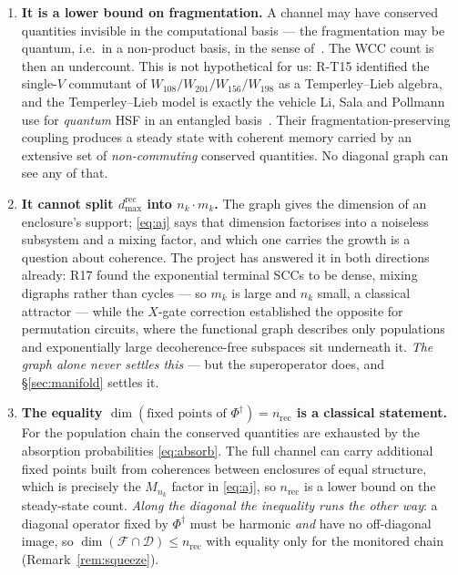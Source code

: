 \documentclass[11pt]{article}
\newcommand{\Phid}{\Phi^{\dagger}}
\theoremstyle{plain}
\theoremstyle{definition}
\theoremstyle{remark}
\begin{document}
\begin{enumerate}
\item \textbf{It is a lower bound on fragmentation.} A channel may have
conserved quantities invisible in the computational basis --- the fragmentation
may be quantum, i.e.\ in a non-product basis, in the sense
of~\cite{mm2022}. The WCC count is then an undercount. This is not
hypothetical for us: R-T15 identified the single-$V$ commutant of
$W_{108}/W_{201}/W_{156}/W_{198}$ as a Temperley--Lieb algebra, and the
Temperley--Lieb model is exactly the vehicle Li, Sala and Pollmann use for
\emph{quantum} HSF in an entangled basis~\cite{li2023}. Their
fragmentation-preserving coupling produces a steady state with coherent memory
carried by an extensive set of \emph{non-commuting} conserved quantities. No
diagonal graph can see any of that.

\item \textbf{It cannot split $d^{\mathrm{rec}}_{\max}$ into $n_k \cdot m_k$.}
The graph gives the dimension of an enclosure's support; \eqref{eq:aj} says
that dimension factorises into a noiseless subsystem and a mixing factor, and
which one carries the growth is a question about coherence. The project has
answered it in both directions already: R17 found the exponential terminal
SCCs to be dense, mixing digraphs rather than cycles --- so $m_k$ is large and
$n_k$ small, a classical attractor --- while the $X$-gate correction
established the opposite for permutation circuits, where the functional graph
describes only populations and exponentially large decoherence-free subspaces
sit underneath it. \emph{The graph alone never settles this} --- but the superoperator does, and \S\ref{sec:manifold} settles it.

\item \textbf{The equality $\dim(\text{fixed points of } \Phid) =
n_{\mathrm{rec}}$ is a classical statement.} For the population chain the
conserved quantities are exhausted by the absorption probabilities
\eqref{eq:absorb}. The full channel can carry additional fixed points built
from coherences between enclosures of equal structure, which is precisely the
$M_{n_k}$ factor in \eqref{eq:aj}, so $n_{\mathrm{rec}}$ is a lower bound on
the steady-state count. \emph{Along the diagonal the inequality runs the other
way}: a diagonal operator fixed by $\Phid$ must be harmonic \emph{and} have no
off-diagonal image, so $\dim(\mathcal{F}\cap\mathcal{D}) \le n_{\mathrm{rec}}$
with equality only for the monitored chain (Remark~\ref{rem:squeeze}).
\end{enumerate}
\end{document}
